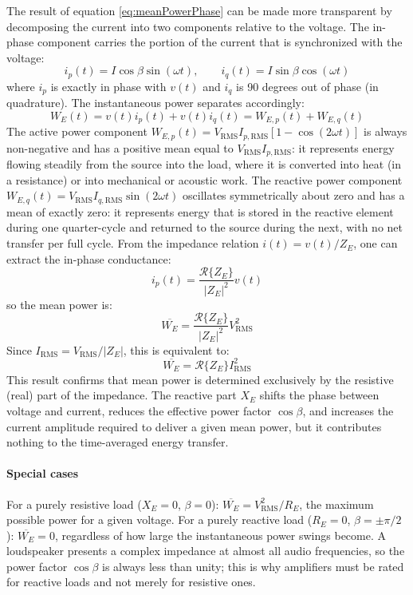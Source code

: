 The result of equation \eqref{eq:meanPowerPhase} can be made more transparent by decomposing the current into two components relative to the voltage. The in-phase component carries the portion of the current that is synchronized with the voltage:
\[
i_p(t) = I\cos\beta \sin(\omega t), \qquad i_q(t) = I\sin\beta \cos(\omega t)
\]
where \(i_p\) is exactly in phase with \(v(t)\) and \(i_q\) is 90 degrees out of phase (in quadrature). The instantaneous power separates accordingly:
\[
W_E(t) = v(t) i_p(t) + v(t) i_q(t) = W_{E,p}(t) + W_{E,q}(t)
\]
The active power component \(W_{E,p}(t) = V_\mathrm{RMS}I_{p,\mathrm{RMS}}[1 - \cos(2\omega t)]\) is always non-negative and has a positive mean equal to \(V_\mathrm{RMS}I_{p,\mathrm{RMS}}\): it represents energy flowing steadily from the source into the load, where it is converted into heat (in a resistance) or into mechanical or acoustic work. The reactive power component \(W_{E,q}(t) = V_\mathrm{RMS}I_{q,\mathrm{RMS}}\sin(2\omega t)\) oscillates symmetrically about zero and has a mean of exactly zero: it represents energy that is stored in the reactive element during one quarter-cycle and returned to the source during the next, with no net transfer per full cycle.
From the impedance relation \(i(t) = v(t)/Z_E\), one can extract the in-phase conductance:
\[
i_p(t) = \frac{\mathcal{R}\{Z_E\}}{|Z_E|^2} v(t)
\]
so the mean power is:
\[
\overline{W_E} = \frac{\mathcal{R}\{Z_E\}}{|Z_E|^2} V_\mathrm{RMS}^2
\]
Since \(I_\mathrm{RMS} = V_\mathrm{RMS}/|Z_E|\), this is equivalent to:
\begin{equation}
    \overline{W_E} = \mathcal{R}\{Z_E\} I_\mathrm{RMS}^2
    \label{eq:meanPowerZ}
\end{equation}
This result confirms that mean power is determined exclusively by the resistive (real) part of the impedance. The reactive part \(X_E\) shifts the phase between voltage and current, reduces the effective power factor \(\cos\beta\), and increases the current amplitude required to deliver a given mean power, but it contributes nothing to the time-averaged energy transfer.

\paragraph{Special cases} For a purely resistive load (\(X_E = 0\), \(\beta = 0\)): \(\overline{W_E} = V_\mathrm{RMS}^2/R_E\), the maximum possible power for a given voltage. For a purely reactive load (\(R_E = 0\), \(\beta = \pm\pi/2\)): \(\overline{W_E} = 0\), regardless of how large the instantaneous power swings become. A loudspeaker presents a complex impedance at almost all audio frequencies, so the power factor \(\cos\beta\) is always less than unity; this is why amplifiers must be rated for reactive loads and not merely for resistive ones.

